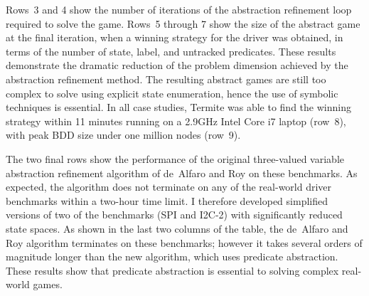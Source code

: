 Rows~3 and 4 show the number of iterations of the abstraction refinement loop required to solve the game.  Rows~5 through 7 show the size of the abstract game at the final iteration, when a winning strategy for the driver was obtained, in terms of the number of state, label, and untracked predicates.  These results demonstrate the dramatic reduction of the problem dimension achieved by the abstraction refinement method.  The resulting abstract games are still too complex to solve using explicit state enumeration, hence the use of symbolic techniques is essential.  In all case studies, Termite was able to find the winning strategy within 11 minutes running on a 2.9GHz Intel Core i7 laptop (row~8), with peak BDD size under one million nodes (row~9).

The two final rows show the performance of the original three-valued variable abstraction refinement algorithm of de~Alfaro and Roy on these benchmarks.  As expected, the algorithm does not terminate on any of the real-world driver benchmarks within a two-hour time limit.  I therefore developed simplified versions of two of the benchmarks (SPI and I2C-2) with significantly reduced state spaces.  As shown in the last two columns of the table, the de~Alfaro and Roy algorithm terminates on these benchmarks; however it takes several orders of magnitude longer than the new algorithm, which uses predicate abstraction.  These results show that predicate abstraction is essential to solving complex real-world games.

